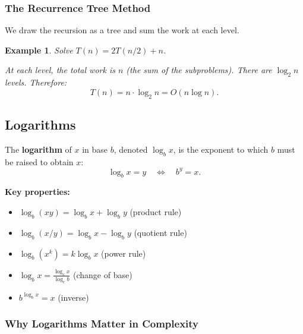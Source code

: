 \documentclass[11pt,a4paper]{article}
\newtheorem{example}[theorem]{Example}
\begin{document}
\subsubsection{The Recurrence Tree Method}

We draw the recursion as a tree and sum the work at each level.

\begin{example}
Solve $T(n) = 2T(n/2) + n$.

\begin{center}
\end{center}

At each level, the total work is $n$ (the sum of the subproblems). There are $\log_2 n$ levels. Therefore:
\[
T(n) = n \cdot \log_2 n = O(n \log n).
\]
\end{example}

\subsection{Logarithms}

The \textbf{logarithm} of $x$ in base $b$, denoted $\log_b x$, is the exponent to which $b$ must be raised to obtain $x$:
\[
\log_b x = y \quad \Longleftrightarrow \quad b^y = x.
\]

\textbf{Key properties:}
\begin{itemize}
    \item $\log_b (xy) = \log_b x + \log_b y$ (product rule)
    \item $\log_b (x/y) = \log_b x - \log_b y$ (quotient rule)
    \item $\log_b (x^k) = k \log_b x$ (power rule)
    \item $\log_b x = \frac{\log_c x}{\log_c b}$ (change of base)
    \item $b^{\log_b x} = x$ (inverse)
\end{itemize}

\subsubsection{Why Logarithms Matter in Complexity}
\end{document}

